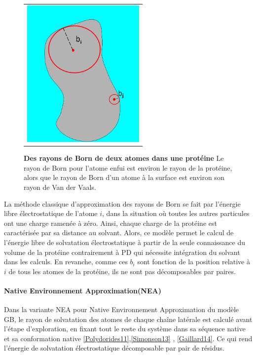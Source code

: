    \begin{figure}[!htbp]
     \centering
     \begin{tabular}{c}
       \includegraphics[width=6cm]{figure/rayon_Born.png} &
     \end{tabular}
     
     \caption{\textbf{Des rayons de Born de deux atomes dans une protéine} Le rayon de Born pour l'atome enfui est environ le rayon de la protéine, alors que le rayon de Born d'un atome à la surface est environ son rayon de Van der Vaals.} 
\label{graph:rayonBorn}
   \end{figure}


La méthode classique d'approximation des rayons de Born se fait par l'énergie libre électrostatique de l'atome $i$, dans la situation où toutes les autres particules ont une charge ramenée à zéro. Ainsi, chaque charge de la protéine est caractérisée par sa distance au solvant. Alors, ce modèle permet le calcul de l'énergie libre de solvatation électrostatique à partir de la seule connaissance du volume de la protéine contrairement à PD qui nécessite intégration du solvant dans les calculs. En revanche, comme ces $b_i$ sont fonction de la position relative à $i$ de tous les atomes de la protéine, ils ne sont pas décomposables par paires.
\paragraph{\og Native Environnement Approximation\fg (NEA)}
\label{NEA}
Dans la variante NEA pour \og Native Environnement Approximation \fg  du modèle GB, le rayon de solvatation des atomes de chaque chaîne latérale est calculé avant l'étape d'exploration, en fixant tout le reste du système dans sa séquence native et sa conformation native \ref {Polydorides11},\ref{Simonson13} , \ref{Gaillard14}. Ce qui rend l'énergie de solvatation électrostatique décomposable par pair de résidus.


